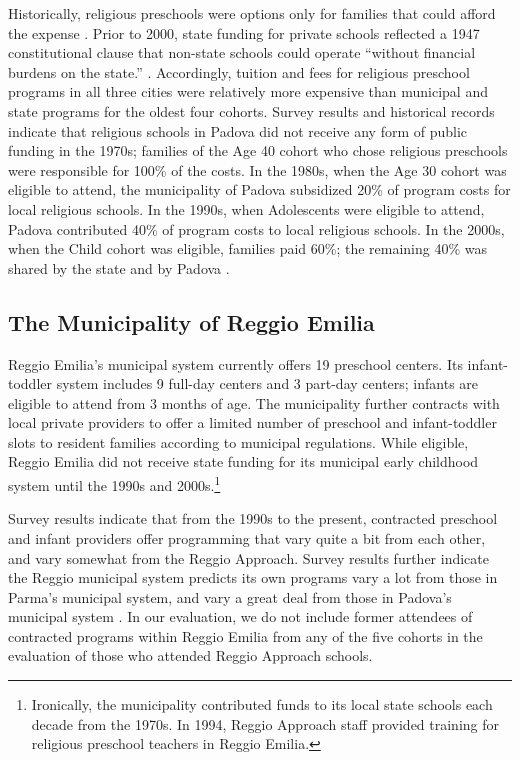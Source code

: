 Historically, religious preschools were options only for families that could afford the expense \citep{Hohnerlein_2009_Paradox-Public-Preschools,Ribolzi_2013_Italy}. Prior to 2000, state funding for private schools reflected a 1947 constitutional clause that non-state schools could operate ``without financial burdens on the state.''  \citep{Hohnerlein_2009_Paradox-Public-Preschools}. Accordingly, tuition and fees for religious preschool programs in all three cities were relatively more expensive than municipal and state programs for the oldest four cohorts. Survey results and historical records indicate that religious schools in Padova did not receive any form of public funding in the 1970s; families of the Age 40 cohort who chose religious preschools were responsible for 100\% of the costs. In the 1980s, when the Age 30 cohort was eligible to attend, the municipality of Padova subsidized 20\% of program costs for local religious schools. In the 1990s, when Adolescents were eligible to attend, Padova contributed 40\% of program costs to local religious schools. In the 2000s, when the Child cohort was eligible, families paid 60\%; the remaining 40\% was shared by the state and by Padova \citep{Reggio-Admin-data_1966-2006, Reggio-Annual-Journals_1994-2011, Padova-Admin-Data_1964-2011,CEHD_2016_Historical-Analysis}. 

\subsection{The Municipality of Reggio Emilia}

Reggio Emilia's municipal system currently offers 19 preschool centers. Its infant-toddler system includes 9 full-day centers and 3 part-day centers; infants are eligible to attend from 3 months of age. The municipality further contracts with local private providers to offer a limited number of preschool and infant-toddler slots to resident families according to municipal regulations. While eligible, Reggio Emilia did not receive state funding for its municipal early childhood system until the 1990s and 2000s.\footnote{Ironically, the municipality contributed funds to its local state schools each decade from the 1970s. In 1994, Reggio Approach staff provided training for religious preschool teachers in Reggio Emilia.}

Survey results indicate that from the 1990s to the present, contracted preschool and infant providers offer programming that vary quite a bit from each other, and vary somewhat from the Reggio Approach. Survey results further indicate the Reggio municipal system predicts its own programs vary a lot from those in Parma's municipal system, and vary a great deal from those in Padova's municipal system \citep{CEHD_2016_Historical-Analysis}. In our evaluation, we do not include former attendees of contracted programs within Reggio Emilia from any of the five cohorts in the evaluation of those who attended Reggio Approach schools. 

